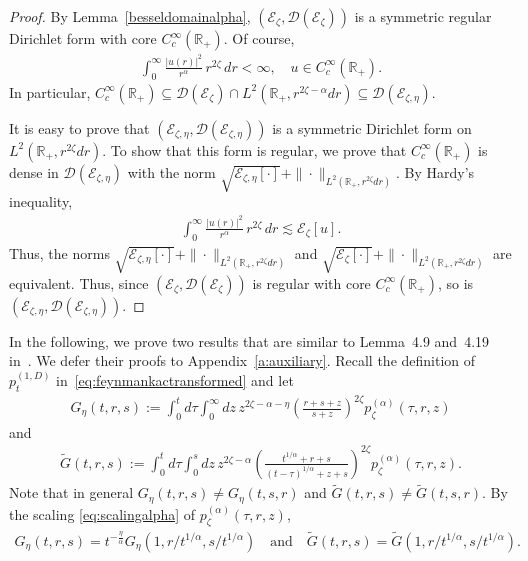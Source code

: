 \documentclass[12pt,reqno]{amsart}
\theoremstyle{definition}
\theoremstyle{remark}
\numberwithin{equation}{section}
\newcommand{\1}{\mathbbm{1}}
\newcommand{\D}{\mathcal{D}}
\newcommand{\R}{\mathbb{R}}
\def\ce{\mathcal{E}}
\newcommand{\one}{\mathbf{1}}
\begin{document}
\begin{proof}
  By Lemma~\ref{besseldomainalpha}, $(\ce_\zeta,\D(\ce_\zeta))$ is a symmetric regular Dirichlet form with core $C_c^\infty(\R_+)$. 
  Of course, 
  \begin{align}
    \int_0^\infty \frac{|u(r)|^2}{r^\alpha}\,r^{2\zeta}\,dr < \infty, \quad u\in C_c^\infty(\R_+).
  \end{align}
  In particular, $C_c^\infty(\R_+)\subseteq \D(\ce_\zeta) \cap L^2(\R_+,r^{2\zeta-\alpha}dr) \subseteq\D(\ce_{\zeta,\eta})$.

  It is easy to prove that $(\ce_{\zeta,\eta},\D(\ce_{\zeta,\eta}))$ is a symmetric Dirichlet form on $L^2(\R_+,r^{2\zeta}dr)$. To show that this form is regular, we prove that $C_c^\infty(\R_+)$ is dense in $\D(\ce_{\zeta,\eta})$ with the norm $\sqrt{\ce_{\zeta,\eta}[\cdot]}+\|\cdot\|_{L^2(\R_+,r^{2\zeta}dr)}$. By Hardy's inequality,
  \begin{align}
    \int_0^\infty \frac{|u(r)|^2}{r^\alpha}\,r^{2\zeta}\,dr \lesssim \ce_\zeta[u].
  \end{align}
  Thus, the norms $\sqrt{\ce_{\zeta,\eta}[\cdot]}+\|\cdot\|_{L^2(\R_+,r^{2\zeta}dr)}$ and $\sqrt{\ce_{\zeta}[\cdot]}+\|\cdot\|_{L^2(\R_+,r^{2\zeta}dr)}$ are equivalent. Thus, since $(\ce_\zeta,\D(\ce_\zeta))$ is regular with core $C_c^\infty(\R_+)$, so is $(\ce_{\zeta,\eta},\D(\ce_{\zeta,\eta}))$.
\end{proof}

In the following, we prove two results that are similar to Lemma~4.9 and~4.19 in~\cite{Bogdanetal2024}. We defer their proofs to Appendix~\ref{a:auxiliary}.
Recall the definition of $p_t^{(1,D)}$ in~\eqref{eq:feynmankactransformed}
and let
\begin{align}
  \label{eq:defgattractive}
  G_\eta(t,r,s) := \int_0^t d\tau \int_0^\infty dz\, z^{2\zeta-\alpha-\eta}
  \left(\frac{r+s+z}{s+z}\right)^{2\zeta} p_\zeta^{(\alpha)}(\tau,r,z)
\end{align}
and
\begin{align}
  \tilde G(t,r,s) := \int_0^t d\tau \int_0^{s} dz\, z^{2\zeta-\alpha} \left(\frac{t^{1/\alpha}+r+s}{(t-\tau)^{1/\alpha}+z+s}\right)^{2\zeta} p_\zeta^{(\alpha)}(\tau,r,z).
\end{align}Note that in general $G_\eta(t,r,s)\neq G_\eta(t,s,r)$ and $\tilde G(t,r,s)\neq \tilde G(t,s,r)$. By the scaling \eqref{eq:scalingalpha} of $p_\zeta^{(\alpha)}(\tau,r,z)$,
\begin{align}
  \label{eq:scalinggattractive}
  G_\eta(t,r,s) = t^{-\frac{\eta}{\alpha}}G_\eta(1,r/t^{1/\alpha},s/t^{1/\alpha})
  \quad \text{and} \quad
  \tilde G(t,r,s) = \tilde G(1,r/t^{1/\alpha},s/t^{1/\alpha}).
\end{align}
\end{document}
